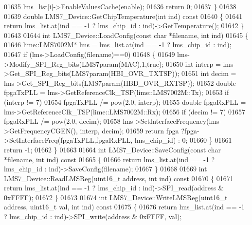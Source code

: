 \begin{DoxyCode}
{{{01635         lms_list[i]->EnableValuesCache(enable);
01636     \textcolor{keywordflow}{return} 0;
01637 \}
01638 
01639 \textcolor{keywordtype}{double} LMS7_Device::GetChipTemperature(\textcolor{keywordtype}{int} ind)\textcolor{keyword}{ const}
01640 \textcolor{keyword}{}\{
01641     \textcolor{keywordflow}{return} lms_list.at(ind == -1 ? lms_chip_id : ind)->GetTemperature();
01642 \}
01643 
01644 \textcolor{keywordtype}{int} LMS7_Device::LoadConfig(\textcolor{keyword}{const} \textcolor{keywordtype}{char} *filename, \textcolor{keywordtype}{int} ind)
01645 \{
01646     lime::LMS7002M* lms = lms_list.at(ind == -1 ? lms_chip_id : ind);
01647     \textcolor{keywordflow}{if} (lms->LoadConfig(filename)==0)
01648     \{
01649         lms->Modify_SPI_Reg_bits(LMS7param(MAC),1,\textcolor{keyword}{true});
01650         \textcolor{keywordtype}{int} interp = lms->Get_SPI_Reg_bits(LMS7param(HBI_OVR_TXTSP));
01651         \textcolor{keywordtype}{int} decim = lms->Get_SPI_Reg_bits(LMS7param(HBD_OVR_RXTSP));
01652         \textcolor{keywordtype}{double} fpgaTxPLL = lms->GetReferenceClk_TSP(lime::LMS7002M::Tx);
01653         \textcolor{keywordflow}{if} (interp != 7)
01654             fpgaTxPLL /= pow(2.0, interp);
01655         \textcolor{keywordtype}{double} fpgaRxPLL = lms->GetReferenceClk_TSP(lime::LMS7002M::Rx);
01656         \textcolor{keywordflow}{if} (decim != 7)
01657             fpgaRxPLL /= pow(2.0, decim);
01658         lms->SetInterfaceFrequency(lms->GetFrequencyCGEN(), interp, decim);
01659         \textcolor{keywordflow}{return} fpga ?fpga->SetInterfaceFreq(fpgaTxPLL,fpgaRxPLL, lms_chip_id) : 0;
01660     \}
01661     \textcolor{keywordflow}{return} -1;
01662 \}
01663 
01664 \textcolor{keywordtype}{int} LMS7_Device::SaveConfig(\textcolor{keyword}{const} \textcolor{keywordtype}{char} *filename, \textcolor{keywordtype}{int} ind)\textcolor{keyword}{ const}
01665 \textcolor{keyword}{}\{
01666     \textcolor{keywordflow}{return} lms_list.at(ind == -1 ? lms_chip_id : ind)->SaveConfig(filename);
01667 \}
01668 
01669 \textcolor{keywordtype}{int} LMS7_Device::ReadLMSReg(uint16\_t address, \textcolor{keywordtype}{int} ind)\textcolor{keyword}{ const}
01670 \textcolor{keyword}{}\{
01671     \textcolor{keywordflow}{return} lms_list.at(ind == -1 ? lms_chip_id : ind)->SPI\_read(address & 0xFFFF);
01672 \}
01673 
01674 \textcolor{keywordtype}{int} LMS7_Device::WriteLMSReg(uint16\_t address, uint16\_t val, \textcolor{keywordtype}{int} ind)\textcolor{keyword}{ const}
01675 \textcolor{keyword}{}\{
01676     \textcolor{keywordflow}{return} lms_list.at(ind == -1 ? lms_chip_id : ind)->SPI\_write(address & 0xFFFF, val);
}}}
\end{DoxyCode}
